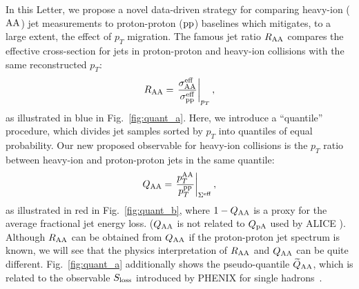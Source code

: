 \documentclass[aps,prl,twocolumn,preprintnumbers,superscriptaddress,showpacs,floatfix, nofootinbib]{revtex4-1}
\newcommand{\pTHI}{p_T^{\rm AA}}
\newcommand{\pTvac}{p_T^{\rm pp}}
\newcommand{\Fig}[1]{Fig.~\ref{#1}}
\begin{document}
In this Letter, we propose a novel data-driven strategy for comparing heavy-ion ($\rm AA$) jet measurements to proton-proton ($\rm pp$) baselines which mitigates, to a large extent, the effect of $p_T$ migration.
%
The famous jet ratio $R_{\rm AA}$ compares the effective cross-section for jets in proton-proton and heavy-ion collisions with the same reconstructed $p_T$:
%
\begin{equation}
	R_{\rm AA} = \left. \frac{\sigma^{\rm eff}_{\rm AA}}{\sigma^{\rm eff}_{\rm pp}} \right|_{p_T},
\end{equation} 
%
as illustrated in blue in \Fig{fig:quant_a}.
%
Here, we introduce a ``quantile'' procedure, which divides jet samples sorted by $p_T$ into quantiles of equal probability.
%
Our new proposed observable for heavy-ion collisions is the $p_T$ ratio between heavy-ion and proton-proton jets in the same quantile:
%
\begin{equation}
\label{eq:QAAdef}
	Q_{\rm AA} = \left. \frac{\pTHI}{\pTvac} \right|_{\Sigma^{\rm eff}},
\end{equation} 
%
as illustrated in red in \Fig{fig:quant_b}, where $1-Q_{\rm AA}$ is a proxy for the average fractional jet energy loss.
%
($Q_{\rm AA}$ is not related to $Q_{\rm pA}$ used by ALICE \cite{Toia:2014wia}).
%
Although $R_{\rm AA}$ can be obtained from $Q_{\rm AA}$ if the proton-proton jet spectrum is known, we will see that the physics interpretation of $R_{\rm AA}$ and $Q_{\rm AA}$ can be quite different.
%
\Fig{fig:quant_a} additionally shows the pseudo-quantile $\widetilde{Q}_{\rm AA}$, which is related to the observable $S_{\rm loss}$ introduced by PHENIX for single hadrons~\cite{Adler:2006bw,Adare:2012wg,Adare:2015cua}.
\end{document}
